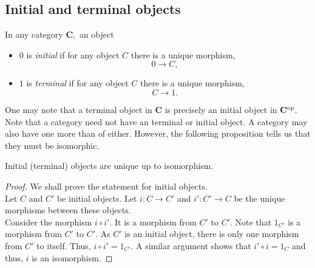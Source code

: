 \subsection{Initial and terminal objects}
\begin{defn} 
	In any category $\mathbf{C},$ an object
	\begin{itemize}
		\item $0$ is \emph{initial} if for any object $C$ there is a unique morphism,
		\begin{equation*} 
			0 \to C,
		\end{equation*}
		\item $1$ is \emph{terminal} if for any object $C$ there is a unique morphism,
		\begin{equation*} 
			C \to 1.
		\end{equation*}
	\end{itemize}
\end{defn}
One may note that a terminal object in $\mathbf{C}$ is precisely an initial object in $\mathbf{C}^{\operatorname{op}}.$ Note that a category need not have an terminal or initial object. A category may also have one more than of either. However, the following proposition tells us that they must be isomorphic.
\begin{prop}
	Initial (terminal) objects are unique up to isomorphism.
\end{prop}
\begin{proof} 
	We shall prove the statement for initial objects.\\
	Let $C$ and $C'$ be initial objects. Let $i:C\to C'$ and $i':C'\to C$ be the unique morphisms between these objects.\\
	Consider the morphism $i\circ i'.$ It is a morphism from $C'$ to $C'.$ Note that $1_{C'}$ is a morphism from $C'$ to $C'.$ As $C'$ is an initial object, there is only one morphism from $C'$ to itself. Thus, $i\circ i' = 1_{C'}.$ A similar argument shows that $i' \circ i = 1_C$ and thus, $i$ is an isomorphism.
\end{proof}
\example{}
